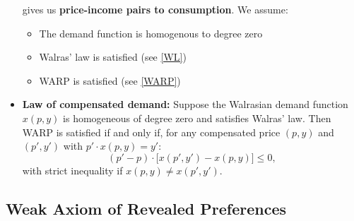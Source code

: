 \documentclass{article}
\begin{document}
\begin{itemize}
\[    \]
    gives us \textbf{price-income pairs to consumption}. We assume:
    \begin{itemize}
        \item The demand function is homogenous to degree zero
        \item Walras' law is satisfied (see \ref{WL})
        \item WARP is satisfied (see \ref{WARP})
    \end{itemize}
    \item \textbf{Law of compensated demand:} Suppose the Walrasian demand function \(x(p, y)\) is homogeneous of degree zero and satisfies Walras' law. Then WARP is satisfied if and only if, for any compensated price \((p, y)\) and \((p', y')\) with \(p' \cdot x(p, y) = y'\):
        \[
        (p' - p) \cdot \big[x(p', y') - x(p, y)\big] \leq 0,
        \]
        with strict inequality if \(x(p, y) \neq x(p', y')\).
\end{itemize}


\subsection{Weak Axiom of Revealed Preferences}
\end{document}
